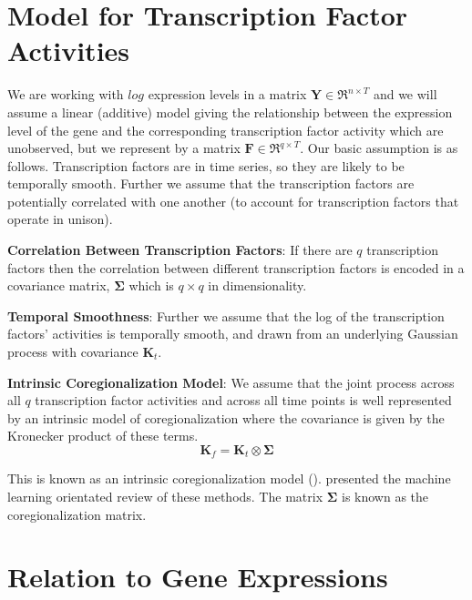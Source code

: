 \section{Model for Transcription Factor Activities}

We are working with $log$ expression levels in a matrix $\mathbf{Y} \in \Re^{n\times T}$ and 
we will assume a linear (additive) model giving the relationship between the expression level 
of the gene and the corresponding transcription factor activity which are unobserved, but we 
represent by a matrix $\mathbf{F} \in \Re^{q\times T}$. Our basic assumption is as follows. 
Transcription factors are in time series, so they are likely to be temporally smooth. 
Further we assume that the transcription factors are potentially correlated with one another 
(to account for transcription factors that operate in unison). 

\textbf{Correlation Between Transcription Factors}:  
If there are $q$ transcription factors then the correlation between different transcription factors is 
encoded in a covariance matrix, $\boldsymbol{\Sigma}$ which is $q\times q$ in dimensionality. 

\textbf{Temporal Smoothness}: 
Further we assume that the log of the transcription factors' activities is temporally smooth, 
and drawn from an underlying Gaussian process with covariance $\mathbf{K}_t$. 

\textbf{ Intrinsic Coregionalization Model}: 
We assume that the joint process across all $q$ transcription factor activities and across all time points 
is well represented by an intrinsic model of coregionalization where the covariance is given by the 
Kronecker product of these terms.
\begin{equation} \label{eq:K}
  \mathbf{K}_f = \mathbf{K}_t \otimes \boldsymbol{\Sigma}
\end{equation}

This is known as an intrinsic coregionalization model (\cite{Wackernagel:2003}). 
\cite{Alvarez:2012} presented the machine learning orientated review of these methods. 
The matrix $\boldsymbol{\Sigma}$ is known as the coregionalization matrix.

\section{Relation to Gene Expressions}

